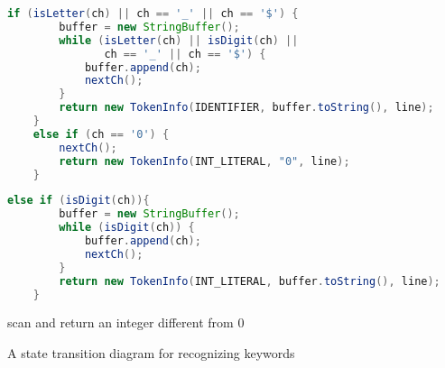 \documentclass[8pt,a4paper,compress]{beamer}
\begin{document}
\begin{frame}[fragile]
\begin{overprint}
\begin{tcolorbox}[enhanced,drop shadow southwest,sharp corners,size=fbox,colback=white,fontlower=\small\ttfamily,collower=silver900]
\begin{lstlisting}[language=Java,style=focusout]
    if (isLetter(ch) || ch == '_' || ch == '$') {
        buffer = new StringBuffer();
        while (isLetter(ch) || isDigit(ch) || 
               ch == '_' || ch == '$') {
            buffer.append(ch);
            nextCh();
        }
        return new TokenInfo(IDENTIFIER, buffer.toString(), line);
    }
    else if (ch == '0') {
        nextCh();
        return new TokenInfo(INT_LITERAL, "0", line);
    }
\end{lstlisting}
\begin{lstlisting}[language=Java,style=focusin,backgroundcolor=\color{lime100}]
    else if (isDigit(ch)){
        buffer = new StringBuffer();
        while (isDigit(ch)) {
            buffer.append(ch);
            nextCh();
        }
        return new TokenInfo(INT_LITERAL, buffer.toString(), line);
    }
\end{lstlisting}

\tcblower
\begin{minipage}[t][.25cm][t]{\textwidth}
scan and return an integer different from 0
\end{minipage}
\end{tcolorbox}
\end{overprint}
\end{frame}

\begin{frame}[fragile]
\pause

A state transition diagram for recognizing keywords

\begin{center}
\end{center}
\end{frame}
\end{document}
